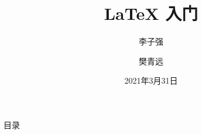 \documentclass{libs/SUSTech_format}
\title[\LaTeX{} 入门]{\huge \textbf{\LaTeX{} 入门}}
\author[CRA 计算机研究协会]{李子强 \inst{1} \and 樊青远 \inst{2}}
\institute[SUSTech]{\inst{1} CSE \and %
                      \inst{2} SME}
\institute[SUSTech]{
    \normalsize
    南方科技大学
}
\date{2021年3月31日}
\begin{document}



{
    \begin{frame}
    \maketitle
    \end{frame}
}

\begin{frame}{目录}
    \begin{multicols}{2}
        \tableofcontents
    \end{multicols}
\end{frame}






\end{document}
